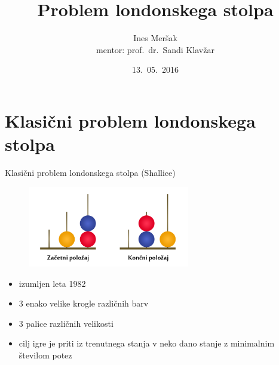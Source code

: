 \documentclass[dvipsnames]{beamer}
\title{Problem londonskega stolpa}
\author[Ines Meršak]{Ines Meršak \\[5px] mentor: prof.~dr.~Sandi Klavžar}
\date{13.~05.~2016}
\begin{document}
    
\begin{frame}[plain]
    \titlepage
\end{frame}


\section{Klasični problem londonskega stolpa}
\begin{frame}{Klasični problem londonskega stolpa (Shallice)}
    \begin{figure}
        \centering
        \includegraphics[height=100pt]{../img/london-tower.png}
    \end{figure}
    \begin{itemize}
        \item izumljen leta 1982
        \item 3 enako velike krogle različnih barv
        \item 3 palice različnih velikosti
        \item cilj igre je priti iz trenutnega stanja v neko dano stanje z minimalnim številom potez
    \end{itemize}
\end{frame}
\end{document}
